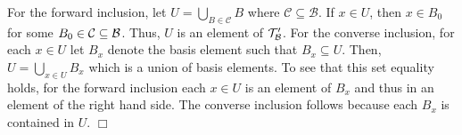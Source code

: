 \documentclass{article}
\begin{document}
 {
    For the forward inclusion, let $U = \bigcup_{B\in \mathcal{C}} B$ where $\mathcal{C}\subseteq \mathcal{B}$. If $x\in U$, then $x\in B_{0}$ for some $B_{0}\in \mathcal{C}\subseteq \mathcal{B}$. Thus, $U$ is an element of $\mathcal{T}_{\mathcal{B}}'$. For the converse inclusion, for each $x\in U$ let $B_{x}$ denote the basis element such that $B_{x}\subseteq U$. Then, $U = \bigcup_{x\in U}B_{x}$ which is a union of basis elements. To see that this set equality holds, for the forward inclusion each $x\in U$ is an element of $B_{x}$ and thus in an element of the right hand side. The converse inclusion follows because each $B_{x}$ is contained in $U$. $\Box$
}
\end{document}
